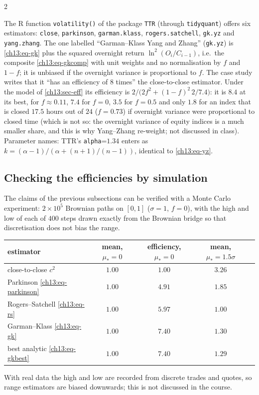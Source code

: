 \begin{paracol}{2}
\begin{coursenote}\label{ch13:cn-names}
The R function \texttt{volatility()} of the package \texttt{TTR} (through \texttt{tidyquant}) offers six estimators:
\texttt{close}, \texttt{parkinson}, \texttt{garman.klass}, \texttt{rogers.satchell}, \texttt{gk.yz} and \texttt{yang.zhang}. The one labelled
``Garman--Klass Yang and Zhang'' (\texttt{gk.yz}) is \eqref{ch13:eq-gk} plus the squared overnight return
$\ln^2(O_i/C_{i-1})$, i.e.\ the composite \eqref{ch13:eq-gkcomp} with unit weights and no normalisation by $f$ and $1-f$; it is
unbiased if the overnight variance is proportional to $f$. The case study writes that it ``has an efficiency of 8 times''
the close-to-close estimator. Under the model of \cref{ch13:sec-eff} its efficiency is $2/\bigl(2f^2+(1-f)^2\,2/7.4\bigr)$: it is $8.4$ at its best, for $f\approx0.11$, $7.4$ for $f=0$,
$3.5$ for $f=0.5$ and only $1.8$ for an index that is closed $17.5$ hours out of $24$ ($f=0.73$) if overnight variance were proportional to closed time (which is not so: the overnight variance of equity indices is a much smaller share, and this is why Yang--Zhang re-weight; not discussed in class). Parameter names: TTR's \texttt{alpha}=$1.34$ enters as
$k=(\alpha-1)/(\alpha+(n+1)/(n-1))$, identical to \eqref{ch13:eq-yz}.
\end{coursenote}

\subsection{Checking the efficiencies by simulation}
\begin{secondary}
The claims of the previous subsections can be verified with a Monte Carlo experiment: $2\times10^5$ Brownian paths on $[0,1]$ ($\sigma=1$, $f=0$), with the high and low of each of $400$ steps drawn exactly from the Brownian bridge so that discretisation does not bias the range.
\begin{center}\small
\begin{tabular}{@{}lcccc@{}}
\toprule
estimator & mean, $\mu_*=0$ & efficiency, $\mu_*=0$ & mean, $\mu_*=1.5\sigma$ & \\
\midrule
close-to-close $c^2$ & $1.00$ & $1.00$ & $3.26$ & \\
Parkinson \eqref{ch13:eq-parkinson} & $1.00$ & $4.91$ & $1.85$ & \\
Rogers--Satchell \eqref{ch13:eq-rs} & $1.00$ & $5.97$ & $1.00$ & \\
Garman--Klass \eqref{ch13:eq-gk} & $1.00$ & $7.40$ & $1.30$ & \\
best analytic \eqref{ch13:eq-gkbest} & $1.00$ & $7.40$ & $1.29$ & \\
\bottomrule
\end{tabular}
\end{center}
With real data the high and low are recorded from discrete trades and quotes, so range estimators are biased downwards; this is
not discussed in the course.
\end{secondary}


\end{paracol}
